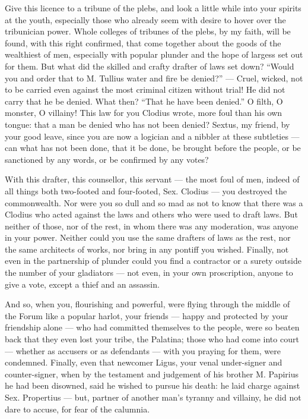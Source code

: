  Give this licence to a tribune of the plebs, and look a little while into your spirits at the youth, especially those who already seem with desire to hover over the tribunician power. Whole colleges of tribunes of the plebs, by my faith, will be found, with this right confirmed, that come together about the goods of the wealthiest of men, especially with popular plunder and the hope of largess set out for them. But what did the skilled and crafty drafter of laws set down? ``Would you and order that to M. Tullius water and fire be denied?'' --- Cruel, wicked, not to be carried even against the most criminal citizen without trial! He did not carry that he be denied. What then? ``That he have been denied.'' O filth, O monster, O villainy! This law for you Clodius wrote, more foul than his own tongue: that a man be denied who has not been denied? Sextus, my friend, by your good leave, since you are now a logician and a nibbler at these subtleties --- can what has not been done, that it be done, be brought before the people, or be sanctioned by any words, or be confirmed by any votes?

 With this drafter, this counsellor, this servant --- the most foul of men, indeed of all things both two-footed and four-footed, Sex. Clodius --- you destroyed the commonwealth. Nor were you so dull and so mad as not to know that there was a Clodius who acted against the laws and others who were used to draft laws. But neither of those, nor of the rest, in whom there was any moderation, was anyone in your power. Neither could you use the same drafters of laws as the rest, nor the same architects of works, nor bring in any pontiff you wished. Finally, not even in the partnership of plunder could you find a contractor or a surety outside the number of your gladiators --- not even, in your own proscription, anyone to give a vote, except a thief and an assassin.

 And so, when you, flourishing and powerful, were flying through the middle of the Forum like a popular harlot, your friends --- happy and protected by your friendship alone --- who had committed themselves to the people, were so beaten back that they even lost your tribe, the Palatina; those who had come into court --- whether as accusers or as defendants --- with you praying for them, were condemned. Finally, even that newcomer Ligus, your venal under-signer and counter-signer, when by the testament and judgement of his brother M. Papirius he had been disowned, said he wished to pursue his death: he laid charge against Sex. Propertius --- but, partner of another man's tyranny and villainy, he did not dare to accuse, for fear of the calumnia.

